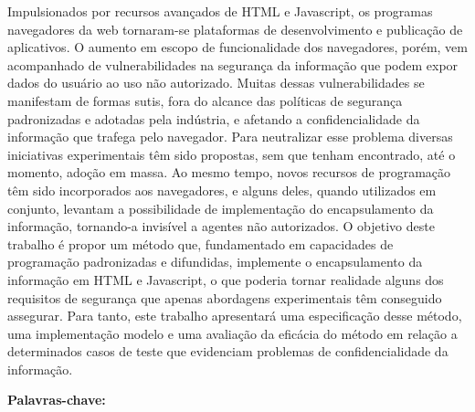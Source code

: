 \newpage
\begin{resumo}
\normalsize

Impulsionados por recursos avançados de HTML e Javascript, os programas navegadores da web tornaram-se plataformas de desenvolvimento e publicação de aplicativos. O aumento em escopo de funcionalidade dos navegadores, porém, vem acompanhado de vulnerabilidades na segurança da informação que podem expor dados do usuário ao uso não autorizado. Muitas dessas vulnerabilidades se manifestam de formas sutis, fora do alcance das políticas de segurança padronizadas e adotadas pela indústria, e afetando a confidencialidade da informação que trafega pelo navegador. Para neutralizar esse problema diversas iniciativas experimentais têm sido propostas, sem que tenham encontrado, até o momento, adoção em massa. Ao mesmo tempo, novos recursos de programação têm sido incorporados aos navegadores, e alguns deles, quando utilizados em conjunto, levantam a possibilidade de implementação do encapsulamento da informação, tornando-a invisível a agentes não autorizados. O objetivo deste trabalho é propor um método que, fundamentado em capacidades de programação padronizadas e difundidas, implemente o encapsulamento da informação em HTML e Javascript, o que poderia tornar realidade alguns dos requisitos de segurança que apenas abordagens experimentais têm conseguido assegurar. Para tanto, este trabalho apresentará uma especificação desse método, uma implementação modelo e uma avaliação da eficácia do método em relação a determinados casos de teste que evidenciam problemas de confidencialidade da informação.

\vspace{\onelineskip}

\noindent
\textbf{Palavras-chave:} \imprimirpalavraschave
\end{resumo}

